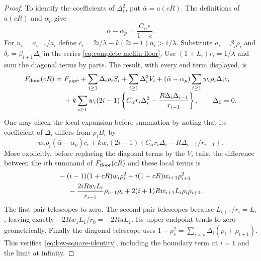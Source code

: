 \begin{proof}
To identify the coefficients of $\Delta_i^2$, put
$\bar\alpha=a(cR)$. The definitions of $a(cR)$ and $\alpha_p$ give
\[
 \bar\alpha-\alpha_p=\frac{C_\alpha e}{1-e}.
\]
For $n_i=a_{i+1}/a_i$ define
$c_i=2i/\lambda-k(2i-1)n_i>1/\lambda$.
Substitute $a_i=\beta_i\rho_i$ and
$\delta_i=\beta_{i+1}\Delta_i$ in the series
\eqref{eq:complete-mellin-floor}.  Use
$(1+L_i)r_i=1/\lambda$ and sum the diagonal terms by parts.  The
result, with every end term displayed, is
\begin{align}
 F_{\rm floor}(cR)={}&F_{\rm pipe}
 +\sum_{i\ge1}\Delta_i\rho_i S_i+\sum_{i\ge1}\Delta_i^2V_i
 +(\bar\alpha-\alpha_p)\sum_{i\ge1}w_i\rho_i\Delta_i c_i
 \nonumber\\[-2pt]
 &+k\sum_{i\ge1}w_i(2i-1)
 \left\{C_\alpha r_i\Delta_i^2
                  -\frac{R\Delta_i\Delta_{i-1}}{r_{i-1}}\right\},
 \qquad\Delta_0=0.\label{eq:low-square-identity}
\end{align}
One may check the local expansion before summation by noting that its
coefficient of $\Delta_i$ differs from $\rho_i B_i$ by
\[
 w_i\rho_i(\bar\alpha-\alpha_p)c_i
 +k w_i(2i-1)\left\{C_\alpha r_i\Delta_i
                         -R\Delta_{i-1}/r_{i-1}\right\}.
\]
More explicitly, before replacing the diagonal terms by the $V_i$
tails, the difference between the $i$th summand of $F_{\rm floor}(cR)$ and these local
terms is
\begin{align*}
 &-(i-1)(1+cR)w_i\rho_i^2
       +i(1+cR)w_{i+1}\rho_{i+1}^2\\
 &\hspace{5mm}
 -\frac{2iRw_iL_i}{r_{i-1}}\rho_{i-1}\rho_i
       +2(i+1)Rw_{i+1}L_i\rho_i\rho_{i+1}.
\end{align*}
The first pair telescopes to zero.  The second pair telescopes because
$L_{i+1}/r_i=L_i$, leaving exactly
$-2Rw_1L_1/r_0=-2RuL_1$.  Its upper endpoint tends to zero
geometrically.  Finally the diagonal telescope uses
$1-\rho_s^2=\sum_{i<s}\Delta_i(\rho_i+\rho_{i+1})$.
This verifies~\eqref{eq:low-square-identity}, including the boundary
term at $i=1$ and the limit at infinity.


\end{proof}
